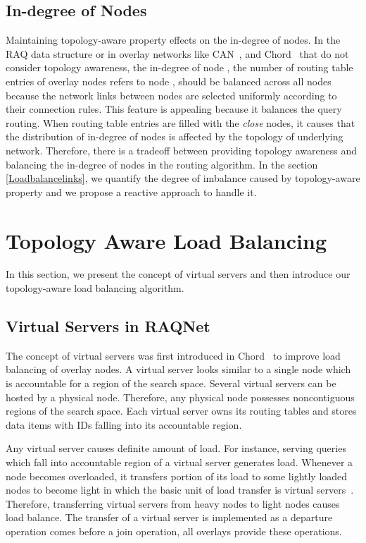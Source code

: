 \documentclass {article}
\begin{document}
\subsection {In-degree of  Nodes}\label{nodelinks}
Maintaining topology-aware property  effects on the in-degree of  nodes. In the RAQ data structure  or in overlay networks like CAN~\cite{CAN}, and Chord~\cite{chord} that do not consider topology awareness, the in-degree of  node , the number of routing table entries of overlay nodes refers to node , should be balanced across all nodes because
the network links between nodes are selected uniformly according to their connection rules. This feature is appealing because it balances the query routing.
When routing table entries are filled with the \emph{close} nodes, it  causes that the distribution of  in-degree of nodes is affected by the topology of underlying network. Therefore, there is a tradeoff between providing topology awareness and balancing the in-degree  of nodes in the routing algorithm. In the section \ref{Loadbalancelinks}, we quantify the degree of imbalance caused by topology-aware property and we propose a reactive approach to handle it.
\section{Topology Aware Load Balancing}\label{topologyloadsec}
In this section, we present the concept of virtual servers  and then introduce  our topology-aware load balancing algorithm.
\subsection{Virtual Servers in RAQNet}
The concept of virtual servers was first introduced in Chord~\cite{chord} to improve load balancing of overlay nodes. A virtual server looks similar to a single node which is accountable for a region of the search space. Several virtual servers can be hosted by a physical node.
Therefore, any physical node possesses  noncontiguous regions of the search space.
Each virtual server owns its routing tables and stores data items with IDs falling into
its accountable region.

Any virtual server causes definite amount of load. For instance, serving queries which fall into  accountable region of a virtual server
 generates  load. Whenever a node becomes overloaded, it transfers portion of its load to some lightly loaded nodes to become light in which the basic unit of load transfer is virtual servers~\cite{loadbalancesp,loadbalancedsp}. Therefore,  transferring virtual servers from heavy nodes to light nodes causes load balance. The transfer of a virtual server is implemented as a departure operation comes before a join operation, all overlays provide these operations.
\end{document}
